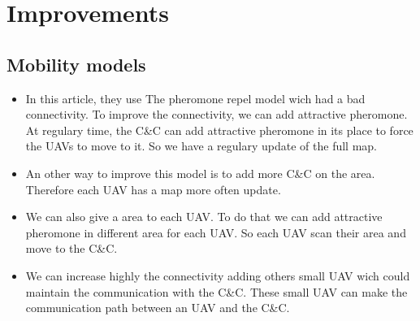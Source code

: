 \chapter{Improvements}

\section{Mobility models}

\begin{itemize}

\item In this article, they use The pheromone repel model wich had a bad connectivity. To improve the connectivity, we can add attractive pheromone. At regulary time, the C\&C can add attractive pheromone in its place to force the UAVs to move to it. So we have a regulary update of the full map.

\item An other way to improve this model is to add more C\&C on the area. Therefore each UAV has a map more often update.

\item We can also give a area to each UAV. To do that we can add attractive pheromone in different area for each UAV. So each UAV scan their area and move to the C\&C.

\item We can increase highly the connectivity adding others small UAV wich could maintain the communication with the C\&C. These small UAV can make the communication path between an UAV and the C\&C. 

\end{itemize}


